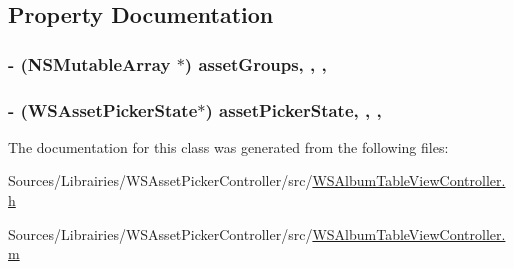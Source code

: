 \subsection{Property Documentation}
\hypertarget{interface_w_s_album_table_view_controller_aa16409464a0d4eacc24b7c2c90489e7c}{
\subsubsection[{asset\-Groups}]{\setlength{\rightskip}{0pt plus 5cm}-\/ (N\-S\-Mutable\-Array $\ast$) asset\-Groups\hspace{0.3cm}{\ttfamily [read]}, {\ttfamily [write]}, {\ttfamily [nonatomic]}, {\ttfamily [strong]}}}\label{interface_w_s_album_table_view_controller_aa16409464a0d4eacc24b7c2c90489e7c}
\hypertarget{interface_w_s_album_table_view_controller_a8e9771fe2f25a4b438cad69c08d2e88a}{
\subsubsection[{asset\-Picker\-State}]{\setlength{\rightskip}{0pt plus 5cm}-\/ ({\bf W\-S\-Asset\-Picker\-State}$\ast$) asset\-Picker\-State\hspace{0.3cm}{\ttfamily [read]}, {\ttfamily [write]}, {\ttfamily [nonatomic]}, {\ttfamily [weak]}}}\label{interface_w_s_album_table_view_controller_a8e9771fe2f25a4b438cad69c08d2e88a}


The documentation for this class was generated from the following files\-:\begin{DoxyCompactItemize}
\item 
Sources/\-Librairies/\-W\-S\-Asset\-Picker\-Controller/src/\hyperlink{_w_s_album_table_view_controller_8h}{W\-S\-Album\-Table\-View\-Controller.\-h}\item 
Sources/\-Librairies/\-W\-S\-Asset\-Picker\-Controller/src/\hyperlink{_w_s_album_table_view_controller_8m}{W\-S\-Album\-Table\-View\-Controller.\-m}\end{DoxyCompactItemize}
